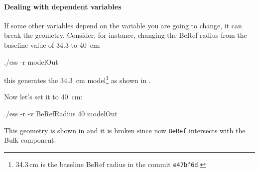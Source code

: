 \paragraph[Dependent variables]{Dealing with dependent variables}
If some other variables depend on the variable you are going to change, it can break the geometry.
Consider, for instance, changing the BeRef radius from the baseline value of 34.3 to \SI{40}{\centi\meter}:
\begin{bash}
  ./ess -r modelOut
\end{bash}
this generates the \SI{34.3}{\centi\meter} model\footnote{34.3\,cm is the baseline BeRef radius in the commit {\tt e47bf6d}.} as shown in .

Now let's set it to \SI{40}{\centi\meter}:
\begin{bash}
  ./ess -r -v BeRefRadius 40 modelOut
\end{bash}
This geometry is shown in  and it is broken since now {\tt BeRef} intersects with the Bulk component.


